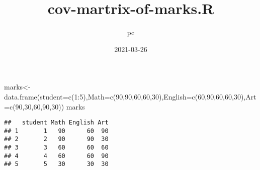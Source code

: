 \documentclass[
]{article}
\title{cov-martrix-of-marks.R}
\author{pc}
\date{2021-03-26}
\newenvironment{Shaded}{\begin{snugshade}}{\end{snugshade}}
\newcommand{\DecValTok}[1]{\textcolor[rgb]{0.00,0.00,0.81}{#1}}
\newcommand{\FunctionTok}[1]{\textcolor[rgb]{0.00,0.00,0.00}{#1}}
\newcommand{\NormalTok}[1]{#1}
\newcommand{\OtherTok}[1]{\textcolor[rgb]{0.56,0.35,0.01}{#1}}
\newcommand{\SpecialCharTok}[1]{\textcolor[rgb]{0.00,0.00,0.00}{#1}}
\newcommand{\StringTok}[1]{\textcolor[rgb]{0.31,0.60,0.02}{#1}}
\begin{document}
\maketitle

\begin{Shaded}
\begin{Highlighting}[]
\NormalTok{marks}\OtherTok{\textless{}{-}}\FunctionTok{data.frame}\NormalTok{(}\StringTok{\textquotesingle{}student\textquotesingle{}}\OtherTok{=}\FunctionTok{c}\NormalTok{(}\DecValTok{1}\SpecialCharTok{:}\DecValTok{5}\NormalTok{),}\StringTok{\textquotesingle{}Math\textquotesingle{}}\OtherTok{=}\FunctionTok{c}\NormalTok{(}\DecValTok{90}\NormalTok{,}\DecValTok{90}\NormalTok{,}\DecValTok{60}\NormalTok{,}\DecValTok{60}\NormalTok{,}\DecValTok{30}\NormalTok{),}\StringTok{\textquotesingle{}English\textquotesingle{}}\OtherTok{=}\FunctionTok{c}\NormalTok{(}\DecValTok{60}\NormalTok{,}\DecValTok{90}\NormalTok{,}\DecValTok{60}\NormalTok{,}\DecValTok{60}\NormalTok{,}\DecValTok{30}\NormalTok{),}\StringTok{\textquotesingle{}Art\textquotesingle{}}\OtherTok{=}\FunctionTok{c}\NormalTok{(}\DecValTok{90}\NormalTok{,}\DecValTok{30}\NormalTok{,}\DecValTok{60}\NormalTok{,}\DecValTok{90}\NormalTok{,}\DecValTok{30}\NormalTok{))}
\NormalTok{marks}
\end{Highlighting}
\end{Shaded}

\begin{verbatim}
##   student Math English Art
## 1       1   90      60  90
## 2       2   90      90  30
## 3       3   60      60  60
## 4       4   60      60  90
## 5       5   30      30  30
\end{verbatim}
\end{document}
